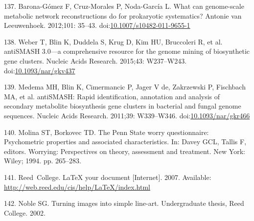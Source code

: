 \documentclass[12pt,twoside]{reedthesis}
\begin{document}
  \hypertarget{ref-barona-gomezux5fwhatux5f2012}{}
  137. Barona-Gómez F, Cruz-Morales P, Noda-García L. What can
  genome-scale metabolic network reconstructions do for prokaryotic
  systematics? Antonie van Leeuwenhoek. 2012;101: 35--43.
  doi:\href{https://doi.org/10.1007/s10482-011-9655-1}{10.1007/s10482-011-9655-1}
  
  \hypertarget{ref-weberux5fantismashux5f2015}{}
  138. Weber T, Blin K, Duddela S, Krug D, Kim HU, Bruccoleri R, et al.
  antiSMASH 3.0---a comprehensive resource for the genome mining of
  biosynthetic gene clusters. Nucleic Acids Research. 2015;43: W237--W243.
  doi:\href{https://doi.org/10.1093/nar/gkv437}{10.1093/nar/gkv437}
  
  \hypertarget{ref-medemaux5fantismash:ux5f2011}{}
  139. Medema MH, Blin K, Cimermancic P, Jager V de, Zakrzewski P,
  Fischbach MA, et al. antiSMASH: Rapid identification, annotation and
  analysis of secondary metabolite biosynthesis gene clusters in bacterial
  and fungal genome sequences. Nucleic Acids Research. 2011;39:
  W339--W346.
  doi:\href{https://doi.org/10.1093/nar/gkr466}{10.1093/nar/gkr466}
  
  \hypertarget{ref-Molina1994}{}
  140. Molina ST, Borkovec TD. The Penn State worry questionnaire:
  Psychometric properties and associated characteristics. In: Davey GCL,
  Tallis F, editors. Worrying: Perspectives on theory, assessment and
  treatment. New York: Wiley; 1994. pp. 265--283.
  
  \hypertarget{ref-reedweb2007}{}
  141. Reed~College. LaTeX your document {[}Internet{]}. 2007. Available:
  \url{http://web.reed.edu/cis/help/LaTeX/index.html}
  
  \hypertarget{ref-noble2002}{}
  142. Noble SG. Turning images into simple line-art. Undergraduate
  thesis, Reed College. 2002.


\end{document}

